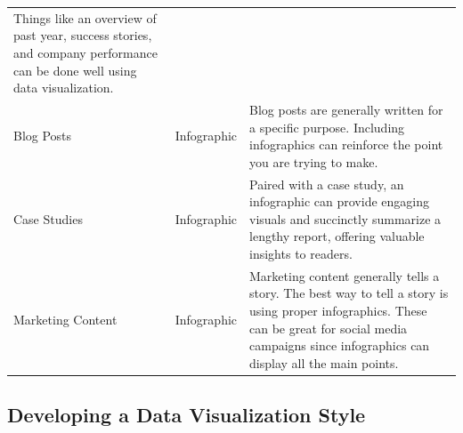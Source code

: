 \documentclass[]{book}
\begin{document}
\begin{longtable}[]{@{}lll@{}}
\begin{minipage}[t]{0.60\columnwidth}
Things like an overview of past year, success stories, and company performance can be done well using data visualization.\strut
\end{minipage}\tabularnewline
\begin{minipage}[t]{0.13\columnwidth}\raggedright
Blog Posts\strut
\end{minipage} & \begin{minipage}[t]{0.18\columnwidth}\raggedright
Infographic\strut
\end{minipage} & \begin{minipage}[t]{0.60\columnwidth}\raggedright
Blog posts are generally written for a specific purpose. Including infographics can reinforce the point you are trying to make.\strut
\end{minipage}\tabularnewline
\begin{minipage}[t]{0.13\columnwidth}\raggedright
Case Studies\strut
\end{minipage} & \begin{minipage}[t]{0.18\columnwidth}\raggedright
Infographic\strut
\end{minipage} & \begin{minipage}[t]{0.60\columnwidth}\raggedright
Paired with a case study, an infographic can provide engaging visuals and succinctly summarize a lengthy report, offering valuable insights to readers.\strut
\end{minipage}\tabularnewline
\begin{minipage}[t]{0.13\columnwidth}\raggedright
Marketing Content\strut
\end{minipage} & \begin{minipage}[t]{0.18\columnwidth}\raggedright
Infographic\strut
\end{minipage} & \begin{minipage}[t]{0.60\columnwidth}\raggedright
Marketing content generally tells a story. The best way to tell a story is using proper infographics. These can be great for social media campaigns since infographics can display all the main points.\strut
\end{minipage}\tabularnewline
\bottomrule
\end{longtable}

\hypertarget{developing-a-data-visualization-style}{%
\subsection{Developing a Data Visualization Style}\label{developing-a-data-visualization-style}}
\end{document}
